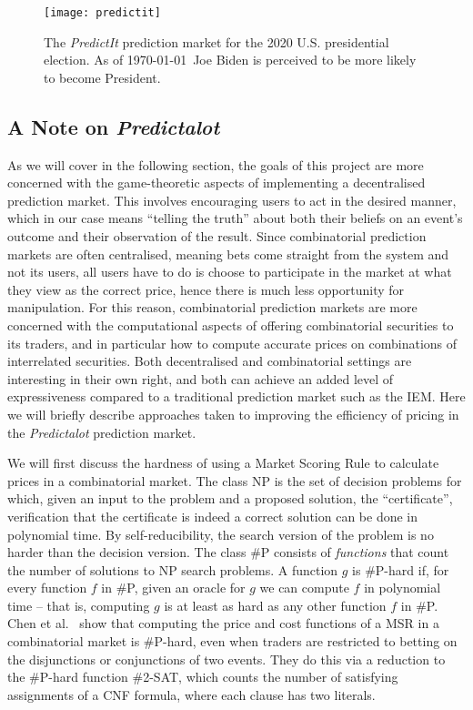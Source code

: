\begin{figure}[h]
	\centering
	\texttt{[image: predictit]}
	\caption{The \emph{PredictIt} prediction market for the 2020 U.S.
	presidential election. As of \today\ Joe Biden is perceived to be more
	likely to become President.}
	\label{fig:predictit}
\end{figure}

\subsection{A Note on \emph{Predictalot}}

As we will cover in the following section, the goals of this project are more
concerned with the game-theoretic aspects of implementing a decentralised
prediction market. This involves encouraging users to act in the desired
manner, which in our case means ``telling the truth'' about both their beliefs
on an event's outcome and their observation of the result. Since combinatorial
prediction markets are often centralised, meaning bets come straight from the
system and not its users, all users have to do is choose to participate in the
market at what they view as the correct price, hence there is much less
opportunity for manipulation. For this reason, combinatorial prediction markets
are more concerned with the computational aspects of offering combinatorial
securities to its traders, and in particular how to compute accurate prices on
combinations of interrelated securities. Both decentralised and combinatorial
settings are interesting in their own right, and both can achieve an added
level of expressiveness compared to a traditional prediction market such as the
IEM. Here we will briefly describe approaches taken to improving the efficiency
of pricing in the \emph{Predictalot} prediction market.

We will first discuss the hardness of using a Market Scoring Rule to calculate
prices in a combinatorial market. The class NP is the set of decision problems
for which, given an input to the problem and a proposed solution, the
``certificate'', verification that the certificate is indeed a correct solution
can be done in polynomial time. By self-reducibility, the search version of the
problem is no harder than the decision version. The class \#P consists of
\emph{functions} that count the number of solutions to NP search problems. A
function $g$ is \#P-hard if, for every function $f$ in \#P, given an oracle for
$g$ we can compute $f$ in polynomial time -- that is, computing $g$ is at least
as hard as any other function $f$ in \#P. Chen et al.~\cite{Chen2008} show that
computing the price and cost functions of a MSR in a combinatorial market is
\#P-hard, even when traders are restricted to betting on the disjunctions or
conjunctions of two events. They do this via a reduction to the \#P-hard
function \textsc{\#2-SAT}, which counts the number of satisfying assignments of
a CNF formula, where each clause has two literals. 

